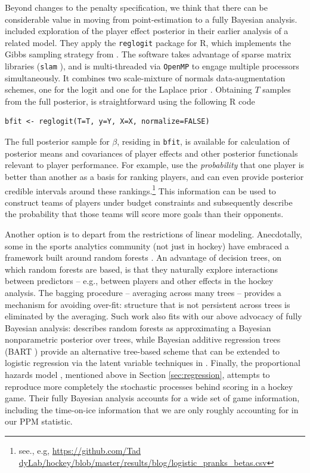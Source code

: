 Beyond changes to the penalty specification, we think that there can be
considerable value in moving from point-estimation to a fully Bayesian
analysis. \cite{gramacy:jensen:taddy:2013}
included exploration of the player effect posterior in their earlier analysis of a related model.  They apply the {\tt reglogit}
package \cite{reglogit} for {\sf R}, which implements the Gibbs sampling strategy
from \cite{gra:pols:2012}. The software takes advantage of
sparse matrix libraries ({\tt slam} \cite{slam}), and is multi-threaded via
{\tt OpenMP} to engage multiple processors simultaneously.  
It combines two scale-mixture of normals data-augmentation schemes, one for the logit
\cite{holmes:held:2006} and one for the Laplace prior \cite{park:casella:2008}.
Obtaining $T$ samples from the full posterior, is straightforward using the
following {\sf R} code
\begin{verbatim}
bfit <- reglogit(T=T, y=Y, X=X, normalize=FALSE)
\end{verbatim}
The full posterior sample for $\beta$, residing in {\tt bfit}, is available for calculation of posterior means and covariances of player effects and other posterior functionals relevant to player performance. For example, \cite{gramacy:jensen:taddy:2013} use the \textit{probability} that one player is better than
another as a basis for ranking players, and can even provide posterior credible intervals around these rankings.\footnote{see., e.g, 
\url{https://github.com/Tad dyLab/hockey/blob/master/results/blog/logistic_pranks_betas.csv}
}  This information can be used to construct teams of players under budget constraints and
subsequently describe the probability that those teams will score more goals
than their opponents.  

Another option is to depart from the restrictions of linear modeling.  Anecdotally, some in the
sports analytics community (not just in hockey) have embraced a framework
built around random forests
\cite{breiman:2001}.  An advantage of decision trees, on which random forests
are based, is that they naturally explore interactions between predictors --
e.g., between players and other effects in the hockey analysis.  The bagging
procedure -- averaging across many trees -- provides a mechanism for avoiding
over-fit: structure that is not persistent across trees is eliminated by the
averaging. Such work also fits with our above advocacy of fully Bayesian
analysis:
 \cite{taddy:eta:2015} describes random forests as approximating a Bayesian
 nonparametric posterior over trees, while  Bayesian additive regression trees
 (BART
\cite{ChipGeorMcCu2010}) provide an alternative tree-based scheme that can be
extended to logistic regression via the  latent variable techniques in
\cite{gra:pols:2012}.   Finally, the proportional hazards model
\cite{ThoVenJen12}, mentioned above in Section \ref{sec:regression},  attempts to reproduce more completely the stochastic
processes behind scoring in a hockey game. Their fully Bayesian analysis
accounts for a wide set of game information, including the time-on-ice
information that we are only roughly accounting for in our PPM statistic.

